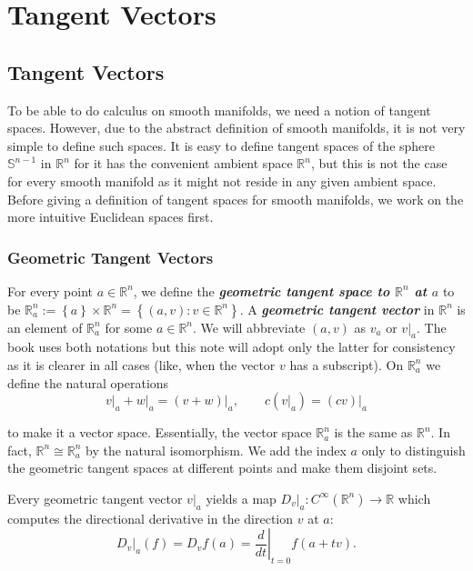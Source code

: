 \chapter{Tangent Vectors}

\section{Tangent Vectors}

To be able to do calculus on smooth manifolds, we need a notion of tangent spaces. However, due to the abstract definition of smooth manifolds, it is not very simple to define such spaces. It is easy to define tangent spaces of the sphere \( \mathbb{S}^{n-1} \) in \( \mathbb{R}^{n} \) for it has the convenient ambient space \( \mathbb{R}^{n} \), but this is not the case for every smooth manifold as it might not reside in any given ambient space. Before giving a definition of tangent spaces for smooth manifolds, we work on the more intuitive Euclidean spaces first.

\subsection{Geometric Tangent Vectors}

For every point \( a \in \mathbb{R}^{n} \), we define the \emph{\textbf{geometric tangent space to \( \mathbb{R}^{n} \) at \( a \)}} to be \( \mathbb{R}_{a}^{n} := \left\{ a \right\} \times \mathbb{R}^{n} = \left\{ (a, v): v \in \mathbb{R}^{n} \right\} \). A \emph{\textbf{geometric tangent vector}} in \( \mathbb{R}^{n} \) is an element of \( \mathbb{R}_{a}^{n} \) for some \( a \in \mathbb{R}^{n} \). We will abbreviate \( (a, v) \) as \( v_{a} \) or \( v\vert_{a} \). The book uses both notations but this note will adopt only the latter for consistency as it is clearer in all cases (like, when the vector \( v \) has a subscript). On \( \mathbb{R}_{a}^{n} \) we define the natural operations
\[
    v\vert_{a} + w\vert_{a} = {(v + w)}\vert_{a}, \qquad c(v\vert_{a}) = {(cv)}\vert_{a}
\]

to make it a vector space. Essentially, the vector space \( \mathbb{R}_{a}^{n} \) is the same as \( \mathbb{R}^{n} \). In fact, \( \mathbb{R}^{n} \cong \mathbb{R}_{a}^{n} \) by the natural isomorphism. We add the index \( a \) only to distinguish the geometric tangent spaces at different points and make them disjoint sets.

Every geometric tangent vector \( v\vert_{a} \) yields a map \( D_{v}\vert_{a}: C^{\infty}(\mathbb{R}^{n}) \to \mathbb{R} \) which computes the directional derivative in the direction \( v \) at \( a \):
\[
    D_{v}\vert_{a}(f) = D_{v}f(a) = \left.\dfrac{d}{dt}\right\vert_{t=0} f(a + tv).
\]

